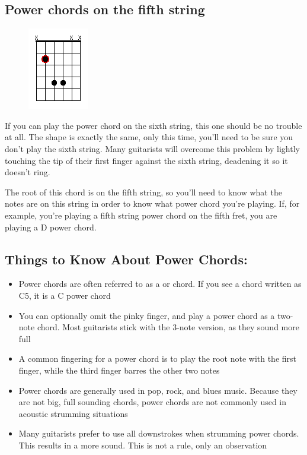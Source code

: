 \subsection{Power chords on the fifth string}
\begin{figure}
\includegraphics{partfour/powerchord5.png}
\end{figure}

If you can play the power chord on the sixth string, this one should be no
trouble at all. The shape is exactly the same, only this time, you'll need to
be sure you don't play the sixth string. Many guitarists will overcome this
problem by lightly touching the tip of their first finger against the sixth
string, deadening it so it doesn't ring.

The root of this chord is on the fifth string, so you'll need to know what the
notes are on this string in order to know what power chord you're playing. If,
for example, you're playing a fifth string power chord on the fifth fret, you
are playing a D power chord.

\subsection{Things to Know About Power Chords:}
\begin{itemize}
\item Power chords are often referred to as a  or  chord. If you see
      a chord written as C5, it is a C power chord
\item You can optionally omit the pinky finger, and play a power chord as a
      two-note chord. Most guitarists stick with the 3-note version, as they sound
      more full
\item A common fingering for a power chord is to play the root note with the
      first finger, while the third finger barres the other two notes
\item Power chords are generally used in pop, rock, and blues music. Because
      they are not big, full sounding chords, power chords are not commonly used in
      acoustic strumming situations
\item Many guitarists prefer to use all downstrokes when strumming power
      chords. This results in a more  sound. This is not a rule, only an
      observation
\end{itemize}

